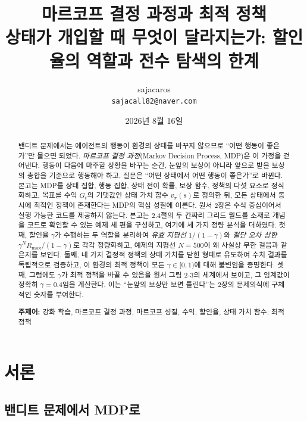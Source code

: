\documentclass[11pt,a4paper]{article}
\title{\bfseries 마르코프 결정 과정과 최적 정책\\[2mm]
\large 상태가 개입할 때 무엇이 달라지는가: 할인율의 역할과 전수 탐색의 한계}
\author{sajacaros\\\small \texttt{sajacall82@naver.com}}
\date{2026년 8월 16일}
\begin{document}
\maketitle

\begin{abstract}
\noindent
밴디트 문제에서는 에이전트의 행동이 환경의 상태를 바꾸지 않으므로 ``어떤 행동이 좋은가''만 물으면
되었다. \emph{마르코프 결정 과정}(Markov Decision Process, MDP)은 이 가정을 걷어낸다. 행동이 다음에
마주할 상황을 바꾸는 순간, 눈앞의 보상이 아니라 앞으로 받을 보상의 총합을 기준으로 행동해야 하고,
질문은 ``어떤 상태에서 어떤 행동이 좋은가''로 바뀐다.
본고는 MDP를 상태 집합, 행동 집합, 상태 전이 확률, 보상 함수, 정책의 다섯 요소로 정식화하고,
목표를 수익 $G_t$의 기댓값인 상태 가치 함수 $v_\pi(s)$로 정의한 뒤, 모든 상태에서 동시에 최적인
정책이 존재한다는 MDP의 핵심 성질에 이른다.
원서\cite{dlfs4} 2장은 수식 중심이어서 실행 가능한 코드를 제공하지 않는다. 본고는 2.4절의 두 칸짜리
그리드 월드를 소재로 개념을 코드로 확인할 수 있는 예제 세 편을 구성하고, 여기에 세 가지 정량 분석을
더하였다.
첫째, 할인율 $\gamma$가 수행하는 두 역할을 분리하여 \emph{유효 지평선} $1/(1-\gamma)$와 \emph{절단 오차
상한} $\gamma^N R_{\max}/(1-\gamma)$로 각각 정량화하고, 예제의 지평선 $N=500$이 왜 사실상 무한 걸음과
같은지를 보인다.
둘째, 네 가지 결정적 정책의 상태 가치를 닫힌 형태로 유도하여 수치 결과를 독립적으로 검증하고,
이 환경의 최적 정책이 모든 $\gamma\in[0,1)$에 대해 불변임을 증명한다.
셋째, 그럼에도 $\gamma$가 최적 정책을 바꿀 수 있음을 원서 그림 2-3의 세계에서 보이고, 그 임계값이
정확히 $\gamma=0.4$임을 계산한다. 이는 ``눈앞의 보상만 보면 틀린다''는 2장의 문제의식에 구체적인
숫자를 부여한다.

\vspace{2mm}
\noindent\textbf{주제어:} 강화 학습, 마르코프 결정 과정, 마르코프 성질, 수익, 할인율, 상태 가치 함수,
최적 정책
\end{abstract}

\tableofcontents
\vspace{4mm}

\section{서론}

\subsection{밴디트 문제에서 MDP로}
\end{document}
